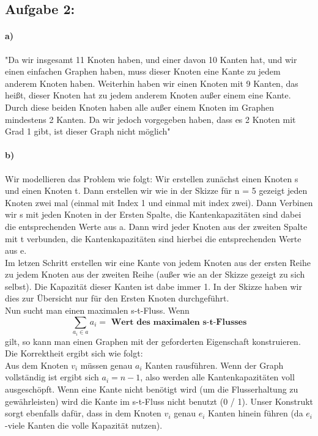\documentclass[a4paper]{article}
\begin{document}
\subsection*{Aufgabe 2:}
\paragraph{a)}
"Da wir insgesamt 11 Knoten haben, und einer davon 10 Kanten hat, und wir einen einfachen Graphen haben, muss dieser Knoten eine Kante zu jedem anderem Knoten haben.
Weiterhin haben wir einen Knoten mit 9 Kanten, das heißt, dieser Knoten hat zu jedem anderem Knoten außer einem eine Kante.
Durch diese beiden Knoten haben alle außer einem Knoten im Graphen  mindestens 2 Kanten. Da wir jedoch vorgegeben haben, dass es 2 Knoten mit Grad 1 gibt, ist dieser Graph nicht möglich"
\paragraph{b)}
Wir modellieren das Problem wie folgt: Wir erstellen zunächst einen Knoten s und einen Knoten
t. Dann erstellen wir wie in der Skizze für n = 5 gezeigt jeden Knoten zwei mal (einmal mit
Index 1 und einmal mit index zwei). Dann Verbinen wir s mit jeden Knoten in der Ersten Spalte,
die Kantenkapazitäten sind dabei die entsprechenden Werte aus a. Dann wird jeder Knoten aus
der zweiten Spalte mit t verbunden, die Kantenkapazitäten sind hierbei die entsprechenden
Werte aus e. \\
Im letzen Schritt erstellen wir eine Kante von jedem Knoten aus der ersten Reihe zu jedem
Knoten aus der zweiten Reihe (außer wie an der Skizze gezeigt zu sich selbst). Die
Kapazität dieser Kanten ist dabe immer 1. In der Skizze haben wir dies zur Übersicht
nur für den Ersten Knoten durchgeführt. \\
Nun sucht man einen maximalen s-t-Fluss. Wenn
\[
    \sum_{a_i \in a} a_i = \textbf{ Wert des maximalen s-t-Flusses}
\]
gilt, so kann man einen Graphen mit der geforderten Eigenschaft konstruieren. \\
Die Korrektheit ergibt sich wie folgt: \\
Aus dem Knoten $v_i$ müssen genau $a_i$ Kanten rausführen. Wenn der Graph vollständig ist
ergibt sich $a_i = n - 1$, also werden alle Kantenkapazitäten voll ausgeschöpft. Wenn eine
Kante nicht benötigt wird (um die Flusserhaltung zu gewährleisten) wird die Kante im
s-t-Fluss nicht benutzt (0 / 1). Unser Konstrukt sorgt ebenfalls dafür, dass in dem Knoten
$v_i$ genau $e_i$ Kanten hinein führen (da $e_i$-viele Kanten die volle Kapazität nutzen). \\
\end{document}
